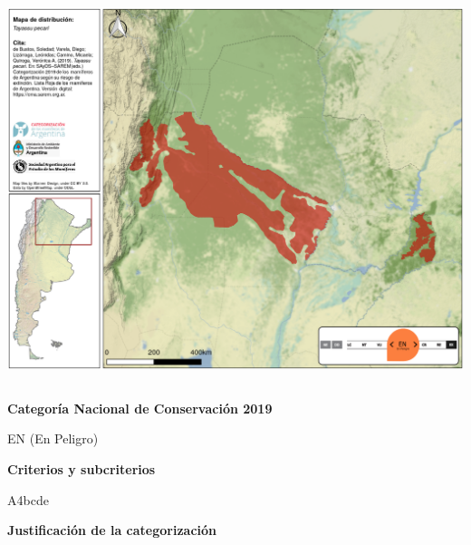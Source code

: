 \documentclass[
  x11names]{article}
\begin{document}
\includegraphics[width=1\linewidth]{maps/Cetartiodactyla/Tayassu_pecari}

%
\begin{table}[H]
\centering
\begin{tabular}[t]{>{\raggedright\arraybackslash}m{16cm}>{}m{16cm}}
\toprule
\cellcolor{ceil}{\textcolor{white}{\textbf{\rule{0pt}{14pt}CATEGORÍAS DE CONSERVACIÓN}}}\\
\bottomrule
\end{tabular}
\end{table}

\vspace{-0.4cm}

\textbf{Categoría Nacional de Conservación 2019}

EN (En Peligro)

\textbf{Criterios y subcriterios}

A4bcde

\textbf{Justificación de la categorización}
\end{document}
